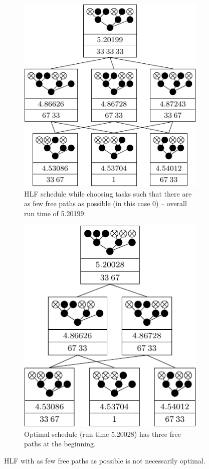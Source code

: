 \begin{figure}[ht]
  \centering
  \begin{subfigure}{.45\textwidth}
    \centering
    \includegraphics{p3/hlfnfc_not_optimal/000111223_hlfnfc.pdf}
    \caption{HLF schedule while choosing tasks such that there are as few free paths as possible (in this case 0) -- overall run time of 5.20199.}
  \end{subfigure}
  \quad
  \begin{subfigure}{.45\textwidth}
    \centering
    \includegraphics{p3/hlfnfc_not_optimal/000111223_opt.pdf}
    \caption{Optimal schedule (run time 5.20028) has three free paths at the beginning.}
  \end{subfigure}
  \caption{HLF with as few free paths as possible is not necessarily optimal.}
  \label{fig:hlfnfc-is-not-optimal}
\end{figure}

